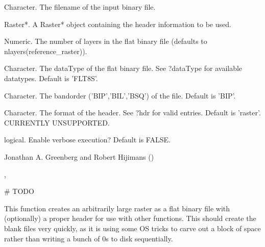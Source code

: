 \documentclass[a4paper]{book}
\begin{document}
\begin{Arguments}
\begin{ldescription}
\item[\code{x\_filename}] Character. The filename of the input
binary file.

\item[\code{reference\_raster}] Raster*. A Raster* object
containing the header information to be used.

\item[\code{out\_nlayers}] Numeric. The number of layers in the
flat binary file (defaults to
nlayers(reference\_raster)).

\item[\code{dataType}] Character. The dataType of the flat
binary file.  See ?dataType for available datatypes.
Default is 'FLT8S'.

\item[\code{bandorder}] Character. The bandorder
('BIP','BIL','BSQ') of the file. Default is 'BIP'.

\item[\code{format}] Character. The format of the header.  See
?hdr for valid entries.  Default is 'raster'.  CURRENTLY
UNSUPPORTED.

\item[\code{verbose}] logical. Enable verbose execution? Default
is FALSE.
\end{ldescription}
\end{Arguments}
%
\begin{Author}\relax
Jonathan A. Greenberg and Robert Hijimans
()
\end{Author}
%
\begin{SeeAlso}\relax
{},
\end{SeeAlso}
%
\begin{Examples}
\begin{ExampleCode}
# TODO
\end{ExampleCode}
\end{Examples}
%
\begin{Description}\relax
This function creates an arbitrarily large raster as a
flat binary file with (optionally) a proper header for
use with other functions.  This should create the blank
files very quickly, as it is using some OS tricks to
carve out a block of space rather than writing a bunch of
0s to disk sequentially.
\end{Description}
\end{document}
